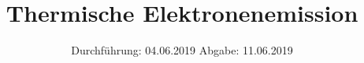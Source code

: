 

\subject{V504}
\title{Thermische Elektronenemission}
\date{%
  Durchführung: 04.06.2019
  \hspace{3em}
  Abgabe: 11.06.2019
}



\maketitle
\thispagestyle{empty}
\tableofcontents
\newpage






\printbibliography{}


